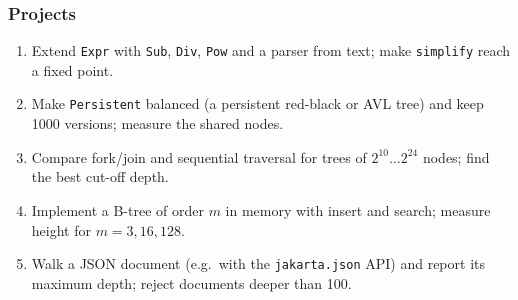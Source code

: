 \documentclass[aspectratio=169,10pt,compress]{beamer}
\begin{document}
\begin{frame}[t,fragile] \frametitle{Projects}
  \begin{enumerate}\small
    \item Extend \texttt{Expr} with \texttt{Sub}, \texttt{Div}, \texttt{Pow} and a parser from text; make \texttt{simplify} reach a fixed point.
    \item Make \texttt{Persistent} balanced (a persistent red-black or AVL tree) and keep 1000 versions; measure the shared nodes.
    \item Compare fork/join and sequential traversal for trees of $2^{10} \dots 2^{24}$ nodes; find the best cut-off depth.
    \item Implement a B-tree of order $m$ in memory with insert and search; measure height for $m = 3, 16, 128$.
    \item Walk a JSON document (e.g.\ with the \texttt{jakarta.json} API) and report its maximum depth; reject documents deeper than 100.
  \end{enumerate}
\end{frame}




\begin{frame}[t,fragile]
	\begin{center}
		\vspace{4cm}
	\end{center}
\end{frame}
\end{document}
